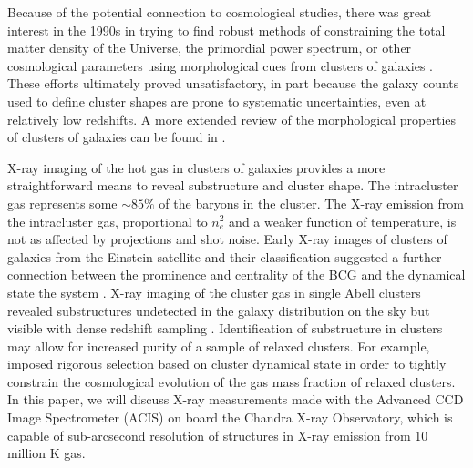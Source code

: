 \documentclass[iop,twocolumn]{emulateapj}
\begin{document}
Because of the potential connection to cosmological studies, there was great interest in the 1990s 
in trying to find robust methods of constraining the total matter density of the Universe, the primordial power spectrum, or other cosmological parameters using morphological cues from
clusters of galaxies  \citep[e.g.,][]{1982A&A...107..338B,1995MNRAS.273...30D,1997ApJ...479..632S}. These efforts ultimately proved unsatisfactory, in part because the galaxy counts used to define cluster shapes are prone to systematic uncertainties, even at relatively low redshifts. 
A more extended review of the morphological properties of clusters of galaxies 
can be found in \citet{2013AstRv...8a..40R}. 

X-ray imaging of the hot gas in clusters of galaxies provides a more straightforward
means to reveal substructure and cluster shape. The intracluster gas represents some $\sim 85\%$ of the baryons in the cluster.
The X-ray emission from the intracluster gas, proportional to $n_e^2$ and a weaker
function of temperature, is not as affected by projections
and shot noise. Early X-ray images of clusters of galaxies from the Einstein satellite and their classification suggested a further connection between the 
prominence and centrality of the BCG and the dynamical state the system \citep{1982ARA&A..20..547F, 1984ApJ...276...38J, 1999ApJ...511...65J}. X-ray imaging of the 
cluster gas in single Abell clusters revealed substructures undetected in the galaxy distribution on the sky but 
visible with dense redshift sampling \citep[e.g.,][]{1983ApJ...264..356B}.  Identification of substructure in clusters may allow
for increased purity of a sample of relaxed clusters.
For example, \citet{2015MNRAS.449..199M} imposed rigorous 
selection based on cluster dynamical state in order to tightly constrain the cosmological evolution of the gas mass fraction of relaxed clusters.
In this paper, we will discuss X-ray 
measurements made with the Advanced CCD Image Spectrometer (ACIS) on board the Chandra X-ray Observatory, which is capable
of sub-arcsecond resolution of structures in X-ray emission from 10 million K gas.
\end{document}
